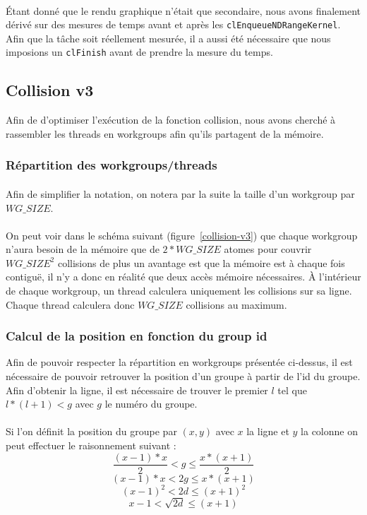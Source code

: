 \documentclass{article}
\begin{document}
\paragraph{}
Étant donné que le rendu graphique n'était que secondaire, nous avons finalement
dérivé sur des mesures de temps avant et après les
\verb!clEnqueueNDRangeKernel!. Afin que la tâche soit réellement mesurée, il
a aussi été nécessaire que nous imposions un \verb!clFinish! avant de prendre
la mesure du temps.

\subsection{Collision v3}
Afin de d'optimiser l'exécution de la fonction collision, nous avons cherché à
rassembler les threads en workgroups afin qu'ils partagent de la mémoire.

\subsubsection{Répartition des workgroups/threads}
\paragraph{}
Afin de simplifier la notation, on notera par la suite la taille d'un
workgroup par $WG\_SIZE$.
\paragraph{}
On peut voir dans le schéma suivant (figure~\ref{collision-v3})
que chaque workgroup n'aura besoin de la mémoire
que de $2 * WG\_SIZE$ atomes pour couvrir $WG\_SIZE^2$ collisions de plus
un avantage est que la mémoire est à chaque fois contiguë, il n'y a donc en
réalité que deux accès mémoire nécessaires. À l'intérieur de chaque workgroup,
un thread calculera uniquement les collisions sur sa ligne. Chaque thread
calculera donc $WG\_SIZE$ collisions au maximum.
\subsubsection{Calcul de la position en fonction du group id}
Afin de pouvoir respecter la répartition en workgroups présentée ci-dessus, il
est nécessaire de pouvoir retrouver la position d'un groupe à partir de l'id du
groupe. Afin d'obtenir la ligne, il est nécessaire de trouver le premier $l$ tel
que $l* (l+1) < g$ avec $g$ le numéro du groupe.
\paragraph{}
Si l'on définit la position du groupe par $(x,y)$ avec $x$ la ligne et $y$ la
colonne on peut effectuer le raisonnement suivant :
$$\frac{(x-1) * x}{2} < g \leq \frac{x * (x+1)}{2}$$
$$(x-1) * x < 2g \leq x * (x+1)$$
$$(x-1)^2 < 2d \leq (x+1)^2$$
$$x-1 < \sqrt{2d} \leq (x+1)$$
\end{document}
